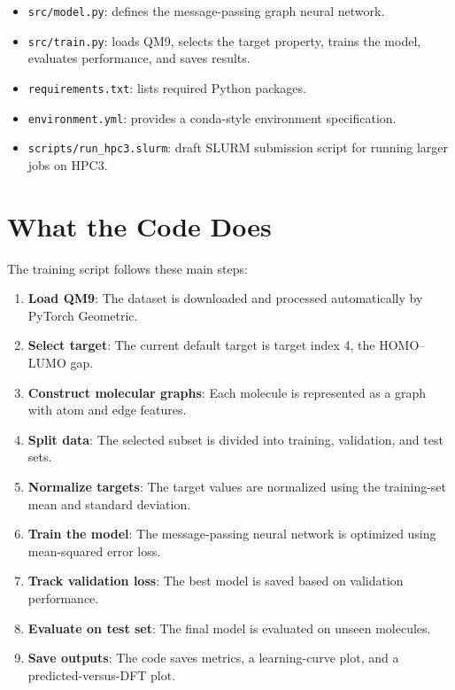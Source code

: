 \documentclass[11pt]{article}
\begin{document}
\begin{itemize}[leftmargin=1.5em]
    \item \texttt{src/model.py}: defines the message-passing graph neural network.
    \item \texttt{src/train.py}: loads QM9, selects the target property, trains the model, evaluates performance, and saves results.
    \item \texttt{requirements.txt}: lists required Python packages.
    \item \texttt{environment.yml}: provides a conda-style environment specification.
    \item \texttt{scripts/run\_hpc3.slurm}: draft SLURM submission script for running larger jobs on HPC3.
\end{itemize}

\section{What the Code Does}

The training script follows these main steps:

\begin{enumerate}[leftmargin=1.5em]
    \item \textbf{Load QM9}: The dataset is downloaded and processed automatically by PyTorch Geometric.
    \item \textbf{Select target}: The current default target is target index 4, the HOMO--LUMO gap.
    \item \textbf{Construct molecular graphs}: Each molecule is represented as a graph with atom and edge features.
    \item \textbf{Split data}: The selected subset is divided into training, validation, and test sets.
    \item \textbf{Normalize targets}: The target values are normalized using the training-set mean and standard deviation.
    \item \textbf{Train the model}: The message-passing neural network is optimized using mean-squared error loss.
    \item \textbf{Track validation loss}: The best model is saved based on validation performance.
    \item \textbf{Evaluate on test set}: The final model is evaluated on unseen molecules.
    \item \textbf{Save outputs}: The code saves metrics, a learning-curve plot, and a predicted-versus-DFT plot.
\end{enumerate}
\end{document}
